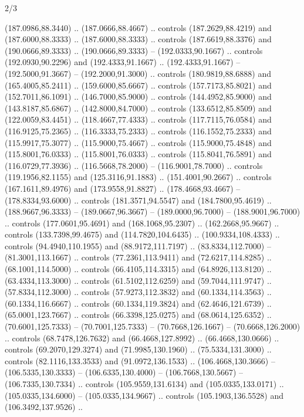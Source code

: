 \begin{flagdescription}{2/3}
\begin{scope}[xshift=0.5\flaglength,yshift=0.5\flagwidth,scale=\flagwidth/525.28]
\begin{scope}[y=0.1mm, x=0.1mm, yscale=-1,shift={(-381.5,-404)}]
\begin{scope}[shift={(5.25001,4.53053)},miter limit=4.00,line width=0.800\lw]
  (187.0986,88.3440) .. (187.0666,88.4667) .. controls (187.2629,88.4219) and
  (187.6000,88.3333) .. (187.6000,88.3333) .. controls (187.6619,88.3376) and
  (190.0666,89.3333) .. (190.0666,89.3333) -- (192.0333,90.1667) .. controls
  (192.0930,90.2296) and (192.4333,91.1667) .. (192.4333,91.1667) --
  (192.5000,91.3667) -- (192.2000,91.3000) .. controls (180.9819,88.6888) and
  (165.4005,85.2411) .. (159.6000,85.6667) .. controls (157.7173,85.8021) and
  (152.7011,86.1091) .. (146.7000,85.9000) .. controls (144.4952,85.9000) and
  (143.8187,85.6867) .. (142.8000,84.7000) .. controls (133.6512,85.8509) and
  (122.0059,83.4451) .. (118.4667,77.4333) .. controls (117.7115,76.0584) and
  (116.9125,75.2365) .. (116.3333,75.2333) .. controls (116.1552,75.2333) and
  (115.9917,75.3077) .. (115.9000,75.4667) .. controls (115.9000,75.4848) and
  (115.8001,76.0333) .. (115.8001,76.0333) .. controls (115.8041,76.5891) and
  (116.0729,77.3936) .. (116.5668,78.2000) -- (116.9001,78.7000) .. controls
  (119.1956,82.1155) and (125.3116,91.1883) .. (151.4001,90.2667) .. controls
  (167.1611,89.4976) and (173.9558,91.8827) .. (178.4668,93.4667) --
  (178.8334,93.6000) .. controls (181.3571,94.5547) and (184.7800,95.4619) ..
  (188.9667,96.3333) -- (189.0667,96.3667) -- (189.0000,96.7000) --
  (188.9001,96.7000) .. controls (177.0601,95.4691) and (168.1068,95.2307) ..
  (162.2668,95.9667) .. controls (133.7398,99.4675) and (114.7820,104.6435) ..
  (100.9334,108.4333) .. controls (94.4940,110.1955) and (88.9172,111.7197) ..
  (83.8334,112.7000) -- (81.3001,113.1667) .. controls (77.2361,113.9411) and
  (72.6217,114.8285) .. (68.1001,114.5000) .. controls (66.4105,114.3315) and
  (64.8926,113.8120) .. (63.4334,113.3000) .. controls (61.5102,112.6259) and
  (59.7044,111.9747) .. (57.8334,112.3000) .. controls (57.9273,112.3832) and
  (60.1334,114.3563) .. (60.1334,116.6667) .. controls (60.1334,119.3824) and
  (62.4646,121.6739) .. (65.0001,123.7667) .. controls (66.3398,125.0275) and
  (68.0614,125.6352) .. (70.6001,125.7333) -- (70.7001,125.7333) --
  (70.7668,126.1667) -- (70.6668,126.2000) .. controls (68.7478,126.7632) and
  (66.4668,127.8992) .. (66.4668,130.0666) .. controls (69.2070,129.3274) and
  (71.9985,130.1960) .. (75.5334,131.3000) .. controls (82.1116,133.3533) and
  (91.0972,136.1533) .. (106.4668,130.3666) -- (106.5335,130.3333) --
  (106.6335,130.4000) -- (106.7668,130.5667) -- (106.7335,130.7334) .. controls
  (105.9559,131.6134) and (105.0335,133.0171) .. (105.0335,134.6000) --
  (105.0335,134.9667) .. controls (105.1903,136.5528) and (106.3492,137.9526) ..

\end{scope}
\end{scope}
\end{scope}
\end{flagdescription}
